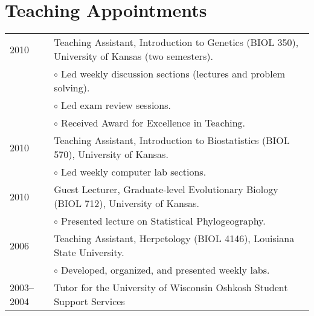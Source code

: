 \documentclass[10pt]{article}
\renewcommand{\labelitemi}{$\circ$}
\newcommand{\tableSubItem}{\addtolength{\leftskip}{1em} \labelitemi \xspace}
\begin{document}
\section*{Teaching Appointments}
\noindent\begin{tabulary}{\textwidth}{ @{} l L @{} }
2010		& Teaching Assistant, Introduction to Genetics (BIOL 350), University of Kansas (two semesters). \\
		& \tableSubItem Led weekly discussion sections (lectures and problem solving). \\
		& \tableSubItem Led exam review sessions. \\
		& \tableSubItem Received Award for Excellence in Teaching. \\[0.25em]
2010		& Teaching Assistant, Introduction to Biostatistics (BIOL 570), University of Kansas. \\
		& \tableSubItem Led weekly computer lab sections. \\[0.25em]
2010		& Guest Lecturer, Graduate-level Evolutionary Biology (BIOL 712), University of Kansas. \\
		& \tableSubItem Presented lecture on Statistical Phylogeography. \\[0.25em]
2006		& Teaching Assistant, Herpetology (BIOL 4146), Louisiana State University. \\
		& \tableSubItem Developed, organized, and presented weekly labs. \\[0.25em]
2003--2004	& Tutor for the University of Wisconsin Oshkosh Student Support Services \\
\end{tabulary}
\end{document}
